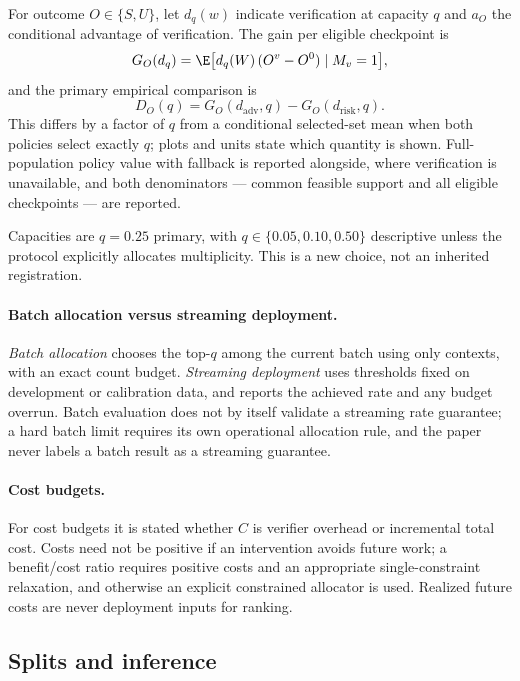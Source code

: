 For outcome $O\in\{S,U\}$, let $d_q(w)$ indicate verification at capacity $q$
and $a_O$ the conditional advantage of verification.  The gain per eligible
checkpoint is
\begin{equation}
 G_O(d_q)=\E\big[d_q(W)\,(O^v-O^0)\mid M_v=1\big],
 \label{eq:b-gain}
\end{equation}
and the primary empirical comparison is
\begin{equation}
 D_O(q)=G_O(d_{\mathrm{adv}},q)-G_O(d_{\mathrm{risk}},q).
 \label{eq:b-primary-estimand}
\end{equation}
This differs by a factor of $q$ from a conditional selected-set mean when both
policies select exactly $q$; plots and units state which quantity is shown.
Full-population policy value with fallback is reported alongside, where
verification is unavailable, and both denominators --- common feasible support
and all eligible checkpoints --- are reported.

Capacities are $q=0.25$ primary, with $q\in\{0.05,0.10,0.50\}$ descriptive
unless the protocol explicitly allocates multiplicity.  This is a new choice,
not an inherited registration.

\paragraph{Batch allocation versus streaming deployment.}
\emph{Batch allocation} chooses the top-$q$ among the current batch using only
contexts, with an exact count budget.  \emph{Streaming deployment} uses
thresholds fixed on development or calibration data, and reports the achieved
rate and any budget overrun.  Batch evaluation does not by itself validate a
streaming rate guarantee; a hard batch limit requires its own operational
allocation rule, and the paper never labels a batch result as a streaming
guarantee.

\paragraph{Cost budgets.}
For cost budgets it is stated whether $C$ is verifier overhead or incremental
total cost.  Costs need not be positive if an intervention avoids future work;
a benefit/cost ratio requires positive costs and an appropriate single-constraint
relaxation, and otherwise an explicit constrained allocator is used.  Realized
future costs are never deployment inputs for ranking.

\subsection{Splits and inference}


